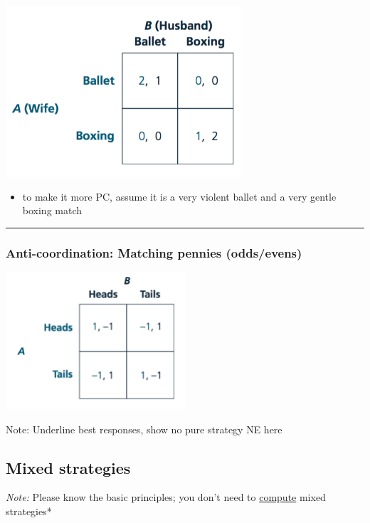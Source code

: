 \documentclass[]{article}
\providecommand{\tightlist}{%
  \setlength{\itemsep}{0pt}\setlength{\parskip}{0pt}}
\begin{document}
\includegraphics[height=2.5in]{picsfigs/bosmatrix.png}

\begin{itemize}
\tightlist
\item
  to make it more PC, assume it is a very violent ballet and a very gentle boxing match
\end{itemize}

\begin{center}\rule{0.5\linewidth}{\linethickness}\end{center}

\hypertarget{anti-coordination-matching-pennies-oddsevens}{%
\subsubsection{Anti-coordination: Matching pennies (odds/evens)}\label{anti-coordination-matching-pennies-oddsevens}}

\includegraphics[height=2in]{picsfigs/matchpennies.png}

Note: Underline best responses, show no pure strategy NE here

\hypertarget{mixed-strategies}{%
\subsection{Mixed strategies}\label{mixed-strategies}}

\emph{Note:} Please know the basic principles; you don't need to \underline{compute} mixed strategies*
\end{document}
